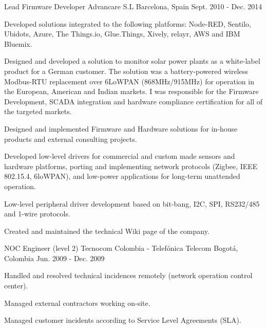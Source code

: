 \begin{cventries}
  \cventry
    {Lead Firmware Developer} %
    {Advancare S.L} %
    {Barcelona, Spain} %
    {Sept. 2010 - Dec. 2014} %
    {
      \begin{cvitems} %
        \item {Developed solutions integrated to the following platforms: Node-RED, Sentilo, Ubidots, Azure, The Things.io, Glue.Things, Xively, relayr, AWS and IBM Bluemix.}
        \item {Designed and developed a solution to monitor solar power plants as a white-label product for a German customer.  The solution was a battery-powered wireless Modbus-RTU replacement over 6LoWPAN (868MHz/915MHz) for operation in the European, American and Indian markets.  I was responsible for the Firmware Development, SCADA integration and hardware compliance certification for all of the targeted markets.}
        \item {Designed and implemented Firmware and Hardware solutions for in-house products and external consulting projects.}
        \item {Developed low-level drivers for commercial and custom made sensors and hardware platforms, porting and implementing network protocols (Zigbee, IEEE 802.15.4, 6loWPAN), and low-power applications for long-term unattended operation.}
        \item {Low-level peripheral driver development based on bit-bang, I2C, SPI, RS232/485 and 1-wire protocols.}
        \item {Created and maintained the technical Wiki page of the company.}
      \end{cvitems}
    }

\end{cventries}


\begin{cventries}

  \cventry
    {NOC Engineer (level 2)} %
    {Tecnocom Colombia - Telefónica Telecom} %
    {Bogotá, Colombia} %
    {Jun. 2009 - Dec. 2009} %
    {
      \begin{cvitems} %
        \item {Handled and resolved technical incidences remotely (network operation control center).}
        \item {Managed external contractors working on-site.}
        \item {Managed customer incidents according to Service Level Agreements (SLA).}        
      \end{cvitems}
    }

\end{cventries}
